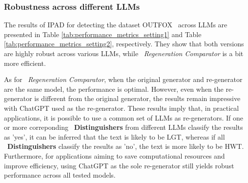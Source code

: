 \subsubsection{Robustness across different LLMs}
The results of IPAD for detecting the dataset OUTFOX~\cite{r3} across LLMs are presented in Table \ref{tab:performance_metrics_setting1} and Table \ref{tab:performance_metrics_setting2}, respectively. They show that both versions are highly robust across various LLMs, while ~\textit{Regeneration Comparator} is a bit more efficient. 

As for ~\textit{Regeneration Comparator}, when the original generator and re-generator are the same model, the performance is optimal. However, even when the re-generator is different from the original generator, the results remain impressive with ChatGPT used as the re-generator. These results imply that, in practical applications, it is possible to use a common set of LLMs as re-generators. If one or more correponding ~\textbf{Distinguishers} from different LLMs classify the results as 'yes', it can be inferred that the text is likely to be LGT, whereas if all ~\textbf{Distinguishers} classify the results as 'no', the text is more likely to be HWT. Furthermore, for applications aiming to save computational resources and improve efficiency, using ChatGPT as the sole re-generator still yields robust performance across all tested models.

\begin{table}[ht!]
  \centering
  \caption{IPAD with ~\textit{Prompt-Text Consistency Verifier} performance on different LLMs}
  \label{tab:performance_metrics_setting1}
\end{table}

